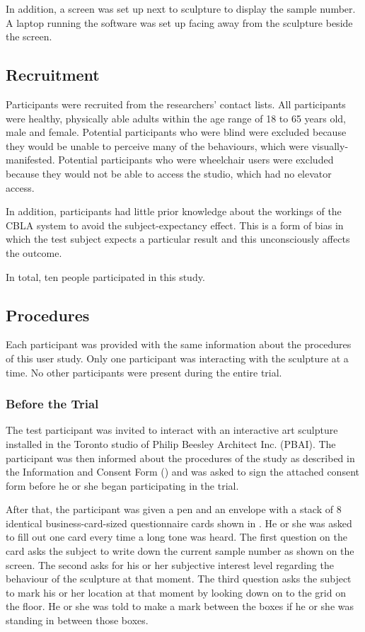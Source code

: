 In addition, a screen was set up next to sculpture to display the sample number. A laptop running the software was set up facing away from the sculpture beside the screen. 


\subsection{Recruitment}

Participants were recruited from the researchers' contact lists. All participants were healthy, physically able adults within the age range of 18 to 65 years old, male and female. Potential participants who were blind were excluded because they would be unable to perceive many of the behaviours, which were visually-manifested. Potential participants who were wheelchair users were excluded because they would not be able to access the studio, which had no elevator access.

In addition, participants had little prior knowledge about the workings of the CBLA system to avoid the subject-expectancy effect. This is a form of bias in which the test subject expects a particular result and this unconsciously affects the outcome. 

In total, ten people participated in this study.

\subsection{Procedures}\label{sec:user-study-procedure}

Each participant was provided with the same information about the procedures of this user study. Only one participant was interacting with the sculpture at a time. No other participants were present during the entire trial. 

\subsubsection{Before the Trial}

The test participant was invited to interact with an interactive art sculpture installed in the Toronto studio of Philip Beesley Architect Inc. (PBAI). The participant was then informed about the procedures of the study as described in the Information and Consent Form () and was asked to sign the attached consent form before he or she began participating in the trial. 

After that, the participant was given a pen and an envelope with a stack of 8 identical business-card-sized questionnaire cards shown in . He or she was asked to fill out one card every time a long tone was heard. The first question on the card asks the subject to write down the current sample number as shown on the screen. The second asks for his or her subjective interest level regarding the behaviour of the sculpture at that moment. The third question asks the subject to mark his or her location at that moment by looking down on to the grid on the floor. He or she was told to make a mark between the boxes if he or she was standing in between those boxes. 

